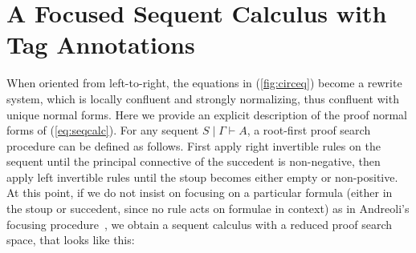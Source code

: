 \documentclass[submission,copyright,creativecommons]{eptcs}
\theoremstyle{definition}
\begin{document}
\section{A Focused Sequent Calculus with Tag Annotations}\label{sec:focusing}
When oriented from left-to-right, the equations in (\ref{fig:circeq}) become a  rewrite system, which is locally confluent and strongly normalizing, thus confluent with unique normal forms. Here we provide an explicit description of the proof normal forms of (\ref{eq:seqcalc}).
For any sequent $S \mid \Gamma \vdash A$, a root-first proof search procedure can be defined as follows. First apply right invertible rules on the sequent until the principal connective of the succedent is non-negative, then apply left invertible rules until the stoup becomes either empty or non-positive. At this point, if we do not insist on focusing on a particular formula (either in the stoup or succedent, since no rule acts on formulae in context) as in Andreoli's focusing procedure~\cite{andreoli:logic:1992}, we obtain a sequent calculus with a reduced proof search space, that looks like this:
\end{document}
